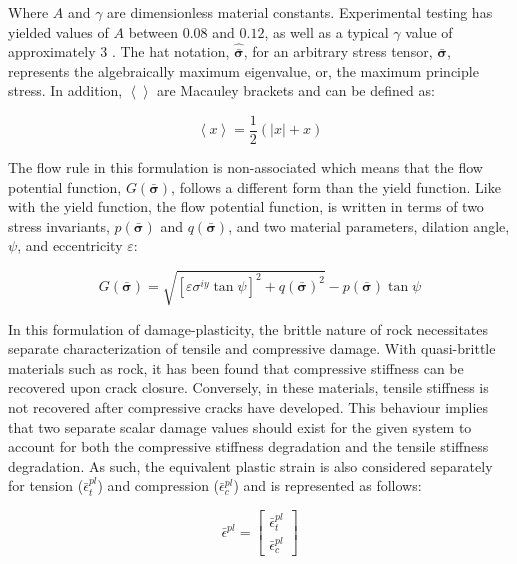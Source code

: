 Where $A$ and $\gamma$ are dimensionless material constants. Experimental testing has yielded values of $A$ between $0.08$ and $0.12$, as well as a typical $\gamma$ value of approximately $3$ \citep{lubliner_plastic-damage_1989}. The hat notation, $\hat{\bar{\boldsymbol{\sigma}}}$, for an arbitrary stress tensor, $\bar{\boldsymbol{\sigma}}$, represents the algebraically maximum eigenvalue, or, the maximum principle stress. In addition, $\left\langle\right\rangle $ are Macauley brackets and can be defined as:

\begin{equation}
\left\langle x\right\rangle =\frac{1}{2}\left(\left|x\right|+x\right)\label{eqn:const9-3}
\end{equation}

The flow rule in this formulation is non-associated which means that the flow potential function, $G\left(\bar{\boldsymbol{\sigma}}\right)$, follows a different form than the yield function. Like with the yield function, the flow potential function, is written in terms of two stress invariants, $p\left(\bar{\boldsymbol{\sigma}}\right)$ and $q\left(\bar{\boldsymbol{\sigma}}\right)$, and two material parameters, dilation angle, $\psi$, and eccentricity $\varepsilon$:

\begin{equation}
G\left(\bar{\boldsymbol{\sigma}}\right)=\sqrt{\left[\varepsilon\sigma^{iy}\tan\psi\right]^{2}+q\left(\bar{\boldsymbol{\sigma}}\right)^{2}}-p\left(\bar{\boldsymbol{\sigma}}\right)\tan\psi\label{eqn:const11c}
\end{equation}

In this formulation of damage-plasticity, the brittle nature of rock necessitates separate characterization of tensile and compressive damage. With quasi-brittle materials such as rock, it has been found that compressive stiffness can be recovered upon crack closure. Conversely, in these materials, tensile stiffness is not recovered after compressive cracks have developed. This behaviour implies that two separate scalar damage values should exist for the given system to account for both the compressive stiffness degradation and the tensile stiffness degradation. As such, the equivalent plastic strain is also considered separately for tension ($\bar{\epsilon}_{t}^{pl}$) and compression ($\bar{\epsilon}_{c}^{pl}$) and is represented as follows: 

\begin{equation}
\bar{\epsilon}^{pl}=
\left[
\begin{array}{c}
    \bar{\epsilon}_{t}^{pl}\\
    \bar{\epsilon}_{c}^{pl}
\end{array}
\right]
\label{eqn:const9}
\end{equation}

